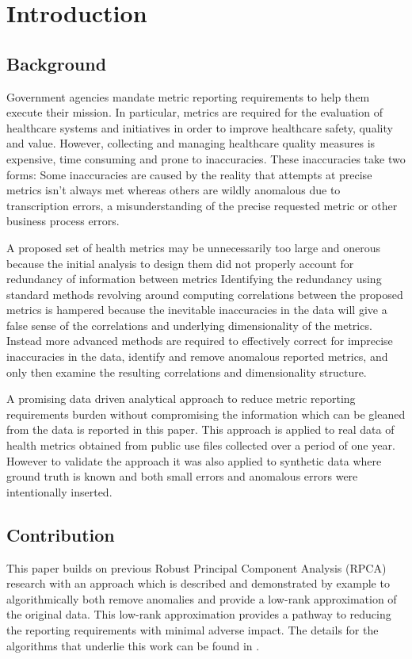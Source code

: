 \documentclass[conference]{IEEEtran}
\begin{document}
\section{Introduction}

\subsection{Background}
Government agencies  mandate  metric reporting requirements to help them execute their mission.  In particular,  metrics are required for the evaluation of healthcare systems and initiatives in order to improve healthcare safety, quality and value. However, collecting and managing healthcare quality measures is expensive,  time consuming and prone to inaccuracies. These inaccuracies take two forms: Some inaccuracies are caused by the reality that attempts at precise metrics isn't always met whereas others  are wildly anomalous due to transcription errors, a misunderstanding of the precise requested metric or other business process errors.

A  proposed set of health metrics may be unnecessarily too large and onerous because the initial analysis to design them did not properly account for redundancy of information between metrics
Identifying the redundancy  using standard methods revolving around computing correlations between the proposed metrics is hampered because the inevitable inaccuracies in the data will give a false sense of the correlations and underlying dimensionality of the metrics.   Instead more advanced methods are required to effectively correct for imprecise inaccuracies in the data, identify and remove anomalous reported metrics, and only then examine the resulting correlations and dimensionality structure.

A promising data driven analytical approach to reduce metric reporting requirements burden without compromising the information which can be gleaned from the data is reported in this paper. This approach is applied to real data of  health metrics obtained from public use files  collected over a period of one year.  However to validate the approach it was also applied  to synthetic  data where ground truth is known and both small errors and anomalous errors were  intentionally inserted.


\subsection{Contribution}
This paper builds on previous Robust Principal Component Analysis (RPCA) research with an approach which is described and demonstrated by example to algorithmically  both remove anomalies and provide a low-rank approximation of the original data.  This low-rank approximation provides a pathway to reducing the reporting requirements with minimal adverse impact.  The details for the algorithms that underlie this work can be found in \cite{paffenroth2018robust,Paffenroth2012}.
\end{document}
